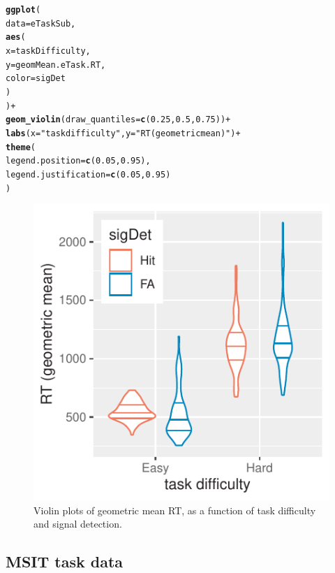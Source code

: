 \documentclass{article}\usepackage[]{graphicx}\usepackage[]{color}
\makeatletter
\newcommand{\hlnum}[1]{\textcolor[rgb]{0.686,0.059,0.569}{#1}}%
\newcommand{\hlstr}[1]{\textcolor[rgb]{0.192,0.494,0.8}{#1}}%
\newcommand{\hlopt}[1]{\textcolor[rgb]{0,0,0}{#1}}%
\newcommand{\hlstd}[1]{\textcolor[rgb]{0.345,0.345,0.345}{#1}}%
\newcommand{\hlkwc}[1]{\textcolor[rgb]{0.333,0.667,0.333}{#1}}%
\newcommand{\hlkwd}[1]{\textcolor[rgb]{0.737,0.353,0.396}{\textbf{#1}}}%
\newenvironment{kframe}{%
 \def\at@end@of@kframe{}%
 \ifinner\ifhmode%
  \def\at@end@of@kframe{\end{minipage}}%
  \begin{minipage}{\columnwidth}%
 \fi\fi%
 \def\FrameCommand##1{\hskip\@totalleftmargin \hskip-\fboxsep
 \colorbox{shadecolor}{##1}\hskip-\fboxsep
     \hskip-\linewidth \hskip-\@totalleftmargin \hskip\columnwidth}%
 \MakeFramed {\advance\hsize-\width
   \@totalleftmargin\z@ \linewidth\hsize
   \@setminipage}}%
 {\par\unskip\endMakeFramed%
 \at@end@of@kframe}
\newenvironment{knitrout}{}{} %
\makeatother
\begin{document}
\begin{knitrout}\footnotesize
{}\color{fgcolor}\begin{kframe}
\begin{alltt}
\hlkwd{ggplot}\hlstd{(}
  \hlkwc{data} \hlstd{= eTaskSub,}
  \hlkwd{aes}\hlstd{(}
    \hlkwc{x} \hlstd{= taskDifficulty,}
    \hlkwc{y} \hlstd{= geomMean.eTask.RT,}
    \hlkwc{color} \hlstd{= sigDet}
  \hlstd{)}
\hlstd{)} \hlopt{+}
  \hlkwd{geom_violin}\hlstd{(}\hlkwc{draw_quantiles} \hlstd{=} \hlkwd{c}\hlstd{(}\hlnum{0.25}\hlstd{,} \hlnum{0.5}\hlstd{,} \hlnum{0.75}\hlstd{))} \hlopt{+}
  \hlkwd{labs}\hlstd{(}\hlkwc{x} \hlstd{=} \hlstr{"task difficulty"}\hlstd{,} \hlkwc{y} \hlstd{=} \hlstr{"RT (geometric mean)"}\hlstd{)} \hlopt{+}
  \hlkwd{theme}\hlstd{(}
    \hlkwc{legend.position} \hlstd{=} \hlkwd{c}\hlstd{(}\hlnum{0.05}\hlstd{,} \hlnum{0.95}\hlstd{),}
    \hlkwc{legend.justification} \hlstd{=} \hlkwd{c}\hlstd{(}\hlnum{0.05}\hlstd{,} \hlnum{0.95}\hlstd{)}
  \hlstd{)}
\end{alltt}
\end{kframe}
\end{knitrout}

\begin{figure}
\begin{knitrout}\footnotesize
{}\color{fgcolor}

{\centering \includegraphics[width=.5\linewidth]{figure/graphics-gg_subjectRT-show-1} 

}



\end{knitrout}
\caption{Violin plots of geometric mean RT, as a function of task difficulty and signal detection.}\label{fig:eTaskRT.Violin}
\end{figure}

\subsection{MSIT task data}
\end{document}
